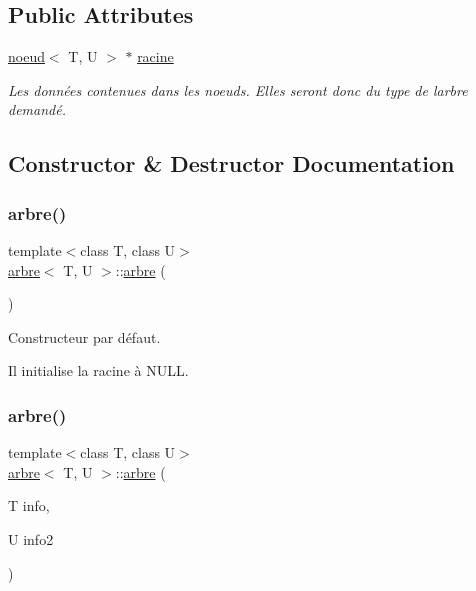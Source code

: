 \subsection*{Public Attributes}
\begin{DoxyCompactItemize}
\item 
\hyperlink{classnoeud}{noeud}$<$ T, U $>$ $\ast$ \hyperlink{classarbre_a6696f16436fec15805cc414162723039}{racine}
\begin{DoxyCompactList}\small\item\em Les données contenues dans les noeuds. Elles seront donc du type de l\textquotesingle{}arbre demandé. \end{DoxyCompactList}\end{DoxyCompactItemize}


\subsection{Constructor \& Destructor Documentation}
\mbox{\label{classarbre_ad2dabd1079df654c9045765137638592}} 
\subsubsection{\texorpdfstring{arbre()}{arbre()}\hspace{0.1cm}{\footnotesize\ttfamily [1/2]}}
{\footnotesize\ttfamily template$<$class T, class U$>$ \\
\hyperlink{classarbre}{arbre}$<$ T, U $>$\+::\hyperlink{classarbre}{arbre} (\begin{DoxyParamCaption}{ }\end{DoxyParamCaption})\hspace{0.3cm}{\ttfamily [inline]}}



Constructeur par défaut. 

Il initialise la racine à N\+U\+LL. \mbox{\label{classarbre_aad1fbd379cfeeb08d03c4ea91144a431}} 
\subsubsection{\texorpdfstring{arbre()}{arbre()}\hspace{0.1cm}{\footnotesize\ttfamily [2/2]}}
{\footnotesize\ttfamily template$<$class T, class U$>$ \\
\hyperlink{classarbre}{arbre}$<$ T, U $>$\+::\hyperlink{classarbre}{arbre} (\begin{DoxyParamCaption}\item[{T}]{info,  }\item[{U}]{info2 }\end{DoxyParamCaption})\hspace{0.3cm}{\ttfamily [inline]}}



